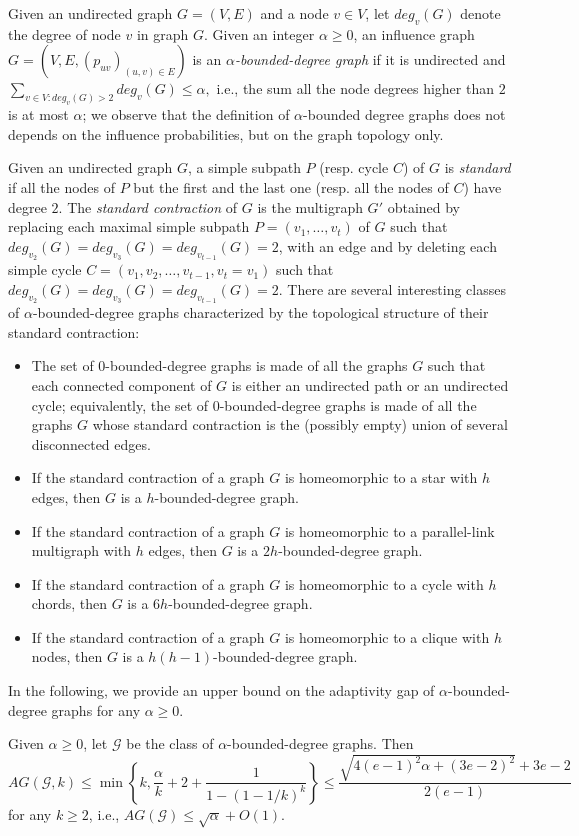 Given an undirected graph $G=(V,E)$ and a node $v\in V$, let $deg_v(G)$ denote the degree of node $v$ in graph $G$. Given an integer $\alpha\geq 0$, an influence graph $G=(V,E,(p_{uv})_{(u,v)\in E})$ is an {\em $\alpha$-bounded-degree graph} if it is undirected and $\sum_{v\in V:deg_v(G)>2}deg_v(G)\leq \alpha,$ i.e., the sum all the node degrees higher than $2$ is at most $\alpha$; we observe that the definition of $\alpha$-bounded degree graphs does not depends on the influence probabilities, but on the graph topology only. 
\begin{example}\label{exam1}
Given an undirected graph $G$, a simple subpath $P$ (resp. cycle $C$) of $G$ is {\em standard} if all the nodes of $P$ but the first and the last one (resp. all the nodes of $C$) have degree $2$. The {\em standard contraction} of $G$ is the multigraph $G'$ obtained by replacing each maximal simple subpath $P=(v_1,\ldots, v_t)$ of $G$ such that $deg_{v_2}(G)=deg_{v_3}(G)=deg_{v_{t-1}}(G)=2$, with an edge and by deleting each simple cycle $C=(v_1,v_2,\ldots, v_{t-1},v_t=v_1)$ such that $deg_{v_2}(G)=deg_{v_3}(G)=deg_{v_{t-1}}(G)=2$. There are several interesting classes of $\alpha$-bounded-degree graphs characterized by the topological structure of their standard contraction:
\begin{itemize}
\item The set of $0$-bounded-degree graphs is made of all the graphs $G$ such that each connected component of $G$ is either an undirected path or an undirected cycle; equivalently, the set of $0$-bounded-degree graphs is made of all the graphs $G$ whose standard contraction is the (possibly empty) union of several disconnected edges.
\item If the standard contraction of a graph $G$ is homeomorphic to a star with $h$ edges, then $G$ is a $h$-bounded-degree graph.
\item If the standard contraction of a graph $G$ is homeomorphic to a parallel-link multigraph with $h$ edges, then $G$ is a $2h$-bounded-degree graph.
\item If the standard contraction of a graph $G$ is homeomorphic to a cycle with $h$ chords, then $G$ is a $6h$-bounded-degree graph.
\item If the standard contraction of a graph $G$ is homeomorphic to a clique with $h$ nodes, then $G$ is a $h(h-1)$-bounded-degree graph.
\end{itemize}
\end{example}
In the following, we provide an upper bound on the adaptivity gap of $\alpha$-bounded-degree graphs for any $\alpha\geq 0$. 
\begin{theorem}\label{thmlast}
Given $\alpha\geq 0$, let $\mathcal{G}$ be the class of  $\alpha$-bounded-degree graphs. Then 
$$AG(\mathcal{G},k)\leq \min\left\{k,\frac{\alpha}{k}+2+ \frac{1}{1-(1-1/k)^k}\right\}\leq \frac{\sqrt{4(e-1)^2\alpha+(3e-2)^2}+3e-2}{2(e-1)}$$
for any $k\geq 2$, i.e., $AG(\mathcal{G})\leq \sqrt{\alpha}+O(1)$. 
\end{theorem}

